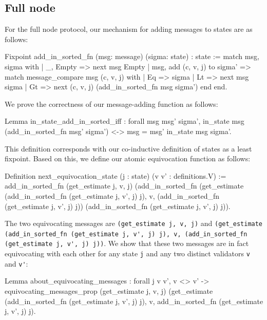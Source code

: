 \documentclass[runningheads]{llncs}
\begin{document}
\subsection{Full node} 
For the full node protocol, our mechanism for adding messages to states are as follows: 
\begin{coq}
Fixpoint add_in_sorted_fn (msg: message) (sigma: state) : state :=
	match msg, sigma with
	| _, Empty => next msg Empty
	| msg, add (c, v, j) to sigma' =>
	match message_compare msg (c, v, j) with
	| Eq => sigma
	| Lt => next msg sigma
	| Gt => next (c, v, j) (add_in_sorted_fn msg sigma')
	end
	end.
\end{coq}
We prove the correctness of our message-adding function as follows: 
\begin{coq}
Lemma in_state_add_in_sorted_iff : forall msg msg' sigma',
	in_state msg (add_in_sorted_fn msg' sigma') <->
	msg = msg' \/ in_state msg sigma'.
\end{coq}
This definition corresponds with our co-inductive definition of states as a least fixpoint. Based on this, we define our atomic equivocation function as follows: 
\begin{coq}
Definition next_equivocation_state (j : state) (v v' : definitions.V) :=
	add_in_sorted_fn
	(get_estimate j, v, j)
	(add_in_sorted_fn
	(get_estimate (add_in_sorted_fn (get_estimate j, v', j) j), v, 
	(add_in_sorted_fn (get_estimate j, v', j) j))
	(add_in_sorted_fn (get_estimate j, v', j) j)).	
\end{coq}
The two equivocating messages are \verb|(get_estimate j, v, j)| and \verb|(get_estimate| \\ \verb|(add_in_sorted_fn (get_estimate j, v', j) j), v, (add_in_sorted_fn| \\ \verb|(get_estimate j, v', j) j))|. We show that these two messages are in fact equivocating with each other for any state \verb|j| and any two distinct validators \verb|v| and \verb|v'|: 
\begin{coq}
Lemma about_equivocating_messages :
	forall j v v',
	v <> v' ->  
	equivocating_messages_prop (get_estimate j, v, j)
	(get_estimate (add_in_sorted_fn (get_estimate j, v', j) j), v, 
	add_in_sorted_fn (get_estimate j, v', j) j). 
\end{coq}
\end{document}
